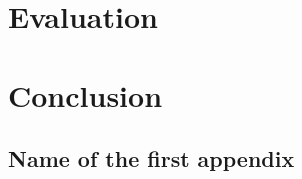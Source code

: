 \documentclass{l4proj}
\begin{document}
 
\chapter{Evaluation}
 
 
\chapter{Conclusion}
 
 
\begin{appendices}
 
\chapter{Name of the first appendix}
 
\end{appendices}
 
 


\end{document}
